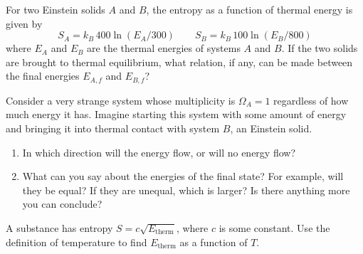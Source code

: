 \begin{problem}
For two Einstein solids $A$ and $B$, the entropy as a function of
thermal energy is given by 
\[
S_A= k_B\, 400\ln(E_A/300) \qquad S_B = k_B\, 100\ln(E_B/800)
\]
where $E_A$ and $E_B$ are the thermal energies of systems $A$ and
$B$.  If the two solids are brought to thermal equilibrium, what
relation, if any, can be made between the final energies $E_{A,f}$ and
$E_{B,f}$? 
\label{prob:entropyoftwosolids}
\end{problem}

\begin{problem}
Consider a very strange system whose multiplicity is $\Omega_A=1$
regardless of how much energy it has.  Imagine starting this system
with some amount of energy and bringing it into thermal contact with
system $B$, an Einstein solid.
\begin{enumerate}
\item In which direction will the energy flow, or will no energy flow?
\item What can you say about the energies of the final state?  For
  example, will they be equal?  If they are unequal, which is larger?
  Is there anything more you can conclude?
\end{enumerate}
\label{prob:strangesystem}
\end{problem}

%

\begin{problem}
A substance has entropy $S=c\sqrt{E_\text{therm}}$, where $c$ is
  some constant.  Use the definition of temperature to find
  $E_\text{therm}$ as a function of $T$.
\end{problem}

